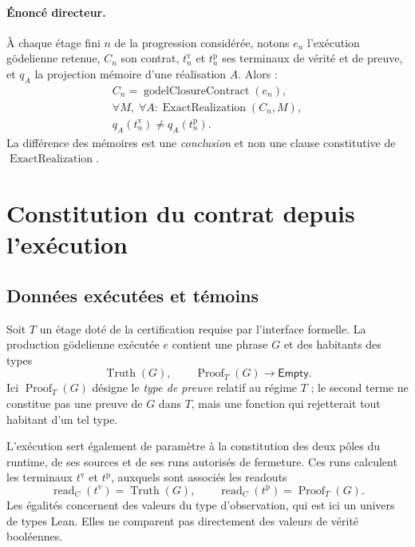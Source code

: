 \documentclass[11pt,a4paper]{article}
\newcommand{\Truth}{\operatorname{Truth}}
\newcommand{\Proof}{\operatorname{Proof}}
\newcommand{\ExactRealization}{\operatorname{ExactRealization}}
\newcommand{\Empty}{\mathsf{Empty}}
\theoremstyle{remark}
\begin{document}
\paragraph{Énoncé directeur.}
À chaque étage fini $n$ de la progression considérée, notons $e_n$
l'exécution gödelienne retenue, $C_n$ son contrat,
$t_n^{\mathrm v}$ et $t_n^{\mathrm p}$ ses terminaux de vérité et de preuve,
et $q_A$ la projection mémoire d'une réalisation $A$. Alors :
\begin{equation}\label{eq:main}
\boxed{\begin{gathered}
C_n=\operatorname{godelClosureContract}(e_n),\\[3pt]
\forall M,\;\forall A:\ExactRealization(C_n,M),\\[2pt]
q_A(t_n^{\mathrm v})\neq q_A(t_n^{\mathrm p}).
\end{gathered}}
\end{equation}
La différence des mémoires est une \emph{conclusion} et non une clause
constitutive de $\ExactRealization$.

\section{Constitution du contrat depuis l'exécution}
\label{sec:contract}

\subsection{Données exécutées et témoins}

Soit $T$ un étage doté de la certification requise par l'interface formelle.
La production gödelienne exécutée $e$ contient une phrase $G$ et des
habitants des types
\begin{equation}\label{eq:witnesses}
\Truth(G),\qquad \Proof_T(G)\longrightarrow\Empty.
\end{equation}
Ici $\Proof_T(G)$ désigne le \emph{type de preuve} relatif au régime $T$ ;
le second terme ne constitue pas une preuve de $G$ dans $T$, mais une
fonction qui rejetterait tout habitant d'un tel type.

L'exécution sert également de paramètre à la constitution des deux pôles du
runtime, de ses sources et de ses runs autorisés de fermeture. Ces runs
calculent les terminaux $t^{\mathrm v}$ et $t^{\mathrm p}$, auxquels sont
associés les readouts
\begin{equation}\label{eq:readouts}
\operatorname{read}_C(t^{\mathrm v})=\Truth(G),\qquad
\operatorname{read}_C(t^{\mathrm p})=\Proof_T(G).
\end{equation}
Les égalités concernent des valeurs du type d'observation, qui est ici un
univers de types Lean. Elles ne comparent pas directement des valeurs de
vérité booléennes.
\end{document}
